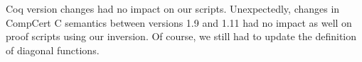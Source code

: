 

Coq version changes had no impact on our scripts.
Unexpectedly, 
changes in CompCert C semantics between versions 1.9 and 1.11
had no impact as well on proof scripts using our inversion.
Of course, we still had to update the definition of diagonal functions. 

